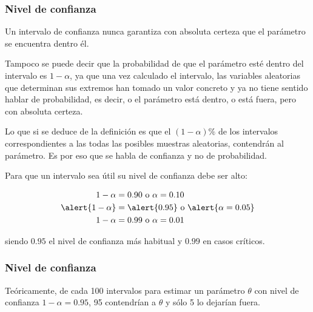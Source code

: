 \begin{frame}
\frametitle{Nivel de confianza}
Un intervalo de confianza nunca garantiza con absoluta certeza que el parámetro se encuentra dentro él.

Tampoco se puede decir que la probabilidad de que el parámetro esté dentro del intervalo es $1-\alpha$, ya que una vez calculado el intervalo, las variables aleatorias que determinan sus extremos han tomado un valor concreto y ya no tiene sentido hablar de probabilidad, es decir, o el parámetro está dentro, o está fuera, pero con absoluta certeza.

Lo que si se deduce de la definición es que el $(1-\alpha)\%$ de los intervalos correspondientes a las todas las posibles muestras aleatorias, contendrán al parámetro. Es por eso que se habla de \alert{confianza} y no de probabilidad.

Para que un intervalo sea útil su nivel de confianza debe ser alto:

\begin{align*}
1-\alpha &= 0.90 \mbox{ o } \alpha=0.10\\
\alert{1-\alpha} &= \alert{0.95} \mbox{ o } \alert{\alpha=0.05}\\
1-\alpha &= 0.99 \mbox{ o } \alpha=0.01\\
\end{align*}

siendo $0.95$ el nivel de confianza más habitual y $0.99$ en casos críticos.
\end{frame}


\begin{frame}
\frametitle{Nivel de confianza}
Teóricamente, de cada 100 intervalos para estimar un parámetro $\theta$ con nivel de confianza $1-\alpha=0.95$, 95 contendrían a $\theta$ y sólo 5 lo dejarían fuera.
\begin{center}
\scalebox{0.85}{}
\end{center}
\end{frame}


